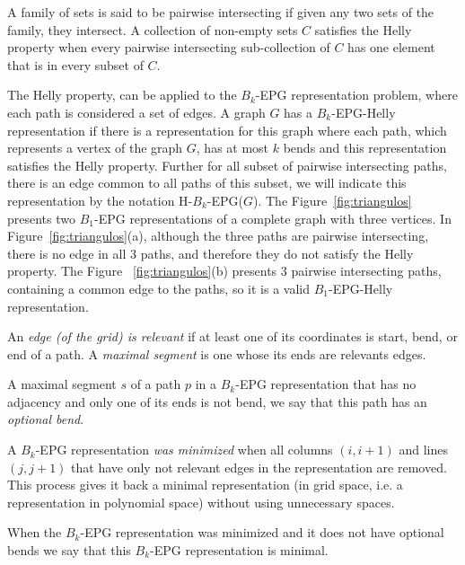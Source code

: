 \documentclass[a4paper,11pt]{article}
\begin{document}
A family of sets is said to be pairwise intersecting if given any two sets of the family, they intersect. A collection of non-empty sets $C$ satisfies the Helly property when every pairwise intersecting sub-collection of $ C $ has one element that is in every subset of $C$.

The Helly property, can be applied to the $ B_k $-EPG representation problem, where each path is considered a set of edges. A graph $ G $ has a  $ B_k$-EPG-Helly representation if there is a representation for this graph where each path, which represents a vertex of the graph $ G $, has at most $ k $ bends and this representation satisfies the Helly property. Further for all subset of pairwise intersecting paths, there is an edge common to all paths of this subset, we will indicate this representation by the notation H-$B_k$-EPG($G$). The Figure~\ref{fig:triangulos} presents two $B_1$-EPG representations of a complete graph with three vertices. In Figure~\ref{fig:triangulos}(a), although the three paths are pairwise intersecting, there is no edge in all 3 paths, and therefore they do not satisfy the Helly property. The Figure~ \ref{fig:triangulos}(b) presents 3 pairwise intersecting paths, containing a common edge to the paths, so it is a valid $ B_1$-EPG-Helly representation.

  

An \emph{edge (of the grid) is relevant} if at least one of its coordinates is start, bend, or end of a path. A  \emph{maximal segment} is one whose its ends are relevants edges.  

A maximal segment $s$ of a path $p$ in a $B_k$-EPG representation that has no adjacency and only one of its ends is not bend, we say that this path has an \emph{optional bend}.   


A $B_k$-EPG representation \emph{was minimized} when all columns $(i,i+1)$ and lines $(j,j+1)$ that have only not relevant edges in the representation are removed. This process gives it back a minimal representation (in grid space, i.e. a representation in polynomial space)  without using unnecessary spaces. 

When the $B_k$-EPG representation was minimized and it does not have optional bends we say that this $B_k$-EPG representation is minimal.
\end{document}
